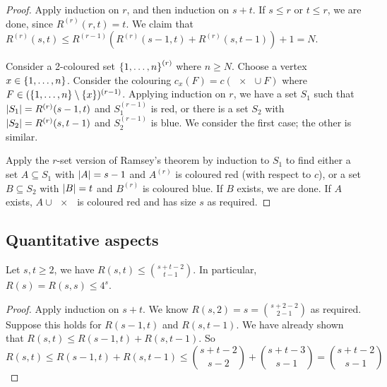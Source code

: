 \begin{proof}
	Apply induction on \( r \), and then induction on \( s + t \).
	If \( s \leq r \) or \( t \leq r \), we are done, since \( R^{(r)}(r,t) = t \).
	We claim that \( R^{(r)}(s,t) \leq R^{(r-1)}(R^{(r)}(s-1,t) + R^{(r)}(s,t-1)) + 1 = N \).

	Consider a 2-coloured set \( \qty{1, \dots, n}^{(r)} \) where \( n \geq N \).
	Choose a vertex \( x \in \qty{1, \dots, n} \).
	Consider the colouring \( c_x(F) = c(\qty{x} \cup F) \) where \( F \in (\qty{1, \dots, n} \setminus \qty{x})^{(r-1)} \).
	Applying induction on \( r \), we have a set \( S_1 \) such that \( \abs{S_1} = R^{(r)}(s-1,t) \) and \( S_1^{(r-1)} \) is red, or there is a set \( S_2 \) with \( \abs{S_2} = R^{(r)}(s,t-1) \) and \( S_2^{(r-1)} \) is blue.
	We consider the first case; the other is similar.

	Apply the \( r \)-set version of Ramsey's theorem by induction to \( S_1 \) to find either a set \( A \subseteq S_1 \) with \( \abs{A} = s - 1 \) and \( A^{(r)} \) is coloured red (with respect to \( c \)), or a set \( B \subseteq S_2 \) with \( \abs{B} = t \) and \( B^{(r)} \) is coloured blue.
	If \( B \) exists, we are done.
	If \( A \) exists, \( A \cup \qty{x} \) is coloured red and has size \( s \) as required.
\end{proof}

\subsection{Quantitative aspects}
\begin{proposition}
	Let \( s, t \geq 2 \), we have \( R(s,t) \leq \binom{s+t-2}{t-1} \).
	In particular, \( R(s) = R(s,s) \leq 4^s \).
\end{proposition}
\begin{proof}
	Apply induction on \( s + t \).
	We know \( R(s,2) = s = \binom{s+2-2}{2-1} \) as required.
	Suppose this holds for \( R(s-1,t) \) and \( R(s,t-1) \).
	We have already shown that \( R(s,t) \leq R(s-1,t) + R(s,t-1) \).
	So
	\[ R(s,t) \leq R(s-1,t) + R(s,t-1) \leq \binom{s+t-2}{s-2} + \binom{s+t-3}{s-1} = \binom{s+t-2}{s-1} \]
\end{proof}
